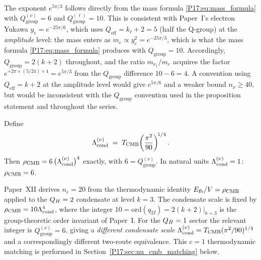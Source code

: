\begin{remark}
\label{P17:rem:Qgroup_vs_Qeff}
The exponent $e^{5\pi/3}$ follows directly from the mass formula
\eqref{P17:eq:mass_formula} with $Q_{\mathrm{group}}^{(\nu)}=6$ and
$Q_{\mathrm{group}}^{(\ell)}=10$.  This is consistent with Paper~I's
electron Yukawa $y_e=e^{-25\pi/6}$, which uses
$Q_{\mathrm{eff}}=k_\ell+2=5$ (half the Q-group) at the
\emph{amplitude} level: the mass enters as $m_e\propto y_e^2
=e^{-25\pi/3}$, which is what the mass formula
\eqref{P17:eq:mass_formula} produces with $Q_{\mathrm{group}}=10$.
Accordingly, $Q_{\mathrm{group}}=2(k+2)$ throughout, and the ratio
$m_{\nu_1}/m_e$ acquires the factor $e^{+2\pi\times(5/24)\times4}
=e^{5\pi/3}$ from the $Q_{\mathrm{group}}$ difference $10-6=4$.
A convention using $Q_{\mathrm{eff}}=k+2$ at the amplitude level
would give $e^{5\pi/6}$ and a weaker bound $n_\nu\geq40$, but would
be inconsistent with the $Q_{\mathrm{group}}$ convention used in the
proposition statement and throughout the series.
\end{remark}

\begin{proposition}[$c=1$ CMB energy identity]
\label{P17:prop:qh1_cmb}
Define
\begin{equation}
  \Lambda_{\mathrm{cond}}^{(\nu)} \;=\;
  T_{\mathrm{CMB}}\!\left(\frac{\pi^2}{90}\right)^{\!1/4}.
  \label{P17:eq:Lcond_nu}
\end{equation}
Then $\rho_{\mathrm{CMB}} = 6\,\bigl(\Lambda_{\mathrm{cond}}^{(\nu)}\bigr)^4$ exactly, with
$6=Q_{\mathrm{group}}^{(\nu)}$. In natural units $\Lambda_{\mathrm{cond}}^{(\nu)}=1$:
$\rho_{\mathrm{CMB}}=6$.
\end{proposition}

\begin{remark}[Why $n_e=20$ does not apply directly]
\label{P17:rem:cmb_fails}
Paper~XII derives $n_e=20$ from the thermodynamic identity
$E_{\mathrm{fb}}/V=\rho_{\mathrm{CMB}}$ applied to the $Q_H=2$ condensate at level $k=3$.
The condensate scale is fixed by $\rho_{\mathrm{CMB}}=10\Lambda_{\mathrm{cond}}^4$, where the integer
$10=\mathrm{ord}(q_{2I})=2(k+2)|_{k=3}$ is the group-theoretic order invariant of
Paper~I. For the $Q_H=1$ sector the relevant integer is $Q_{\mathrm{group}}^{(\nu)}=6$,
giving a \emph{different condensate scale} $\Lambda_{\mathrm{cond}}^{(\nu)}=T_{\mathrm{CMB}}(\pi^2/90)^{1/4}$
and a correspondingly different two-route equivalence.  This
$c=1$ thermodynamic matching is performed in
Section~\ref{P17:sec:nu_cmb_matching} below.
\end{remark}

